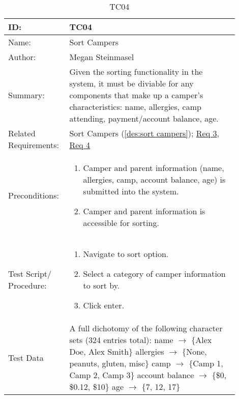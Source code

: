 \documentclass[11pt]{article}
\begin{document}
\begin{table}[H]
\begin{center}
\caption{TC04}
\label{TC04}
\begin{tabular}{p{0.20\linewidth}p{0.70\linewidth}}
	ID: & TC04\\\hline
	Name: & Sort Campers \\\hline
	Author: & Megan Steinmasel\\\hline
	Summary: & Given the sorting functionality in the system, it must be diviable for any components that make up a camper's characteristics: name, allergies, camp attending, payment/account balance, age. \\\hline
	Related \hspace{5em} Requirements:& Sort Campers (\cref{des:sort campers}); \hyperlink{Req3}{Req 3}, \hyperlink{Req4}{Req 4}\\\hline
	Preconditions:& \begin{enumerate}[topsep=0pt] 
		\item Camper and parent information (name, allergies, camp, account balance, age) is submitted into the system.
		\item Camper and parent information is accessible for sorting.
	\end{enumerate}\\\hline
	Test Script/ Procedure: & \begin{enumerate}[topsep=0pt]
	\item Navigate to sort option.
	\item Select a category of camper information to sort by.
	\item Click enter.
	\end{enumerate}\\\hline
	Test Data & \vspace*{.25em} A full dichotomy of the following character sets (324 entries total): \newline
	\hspace*{1cm} name $\rightarrow$ $\{$Alex Doe, Alex Smith$\}$	\newline
	\hspace*{1cm} allergies $\rightarrow$ $\{$None, peanuts, gluten, misc$\}$	\newline
	\hspace*{1cm} camp $\rightarrow$ $\{$Camp 1, Camp 2, Camp 3$\}$\newline
	\hspace*{1cm} account balance $\rightarrow$ $\{$\$0, \$0.12, \$10$\}$\newline
	\hspace*{1cm} age $\rightarrow$ $\{$7, 12, 17$\}$
\end{tabular}
\end{center}
\end{table}
\end{document}
